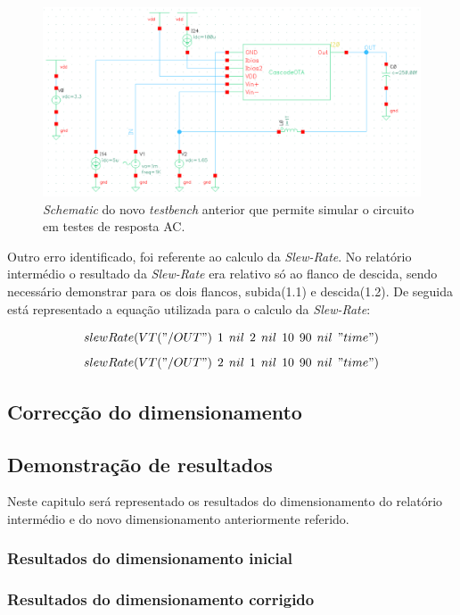 \documentclass[11pt]{article}
\numberwithin{equation}{section}
\begin{document}
\begin{figure}[H]
	\centering
	\includegraphics[keepaspectratio=true, scale=0.60]{exps/TBac}
	\vspace{-0.5em}
	\caption{\textit{Schematic} do novo \textit{testbench} anterior que permite simular o circuito em testes de resposta AC.}
	\vspace{-0.8em}
\end{figure} 

Outro erro identificado, foi referente ao calculo da \textit{Slew-Rate}. No relatório intermédio o resultado da \textit{Slew-Rate} era relativo só ao flanco de descida, sendo necessário demonstrar para os dois flancos, subida(1.1) e descida(1.2). De seguida está representado a equação utilizada para o calculo da \textit{Slew-Rate}:

\vspace{-3mm}
\begin{equation}
	slewRate (VT("/OUT") \:\: 1 \:\: nil \:\: 2 \:\: nil \:\: 10 \:\: 90 \:\: nil \:\: "time")
	\label{eq:corrente}
\end{equation}
\vspace{-3mm}
\begin{equation}
	slewRate (VT("/OUT") \:\: 2 \:\: nil \:\: 1 \:\: nil \:\: 10 \:\: 90 \:\: nil \:\: "time")
	\label{eq:corrente}
\end{equation}
\subsection{Correcção do dimensionamento}

 
\subsection{Demonstração de resultados} 

Neste capitulo será representado os resultados do dimensionamento do relatório intermédio e do novo dimensionamento anteriormente referido. 

\subsubsection{Resultados do dimensionamento inicial} 

\subsubsection{Resultados do dimensionamento corrigido} 
\end{document}
